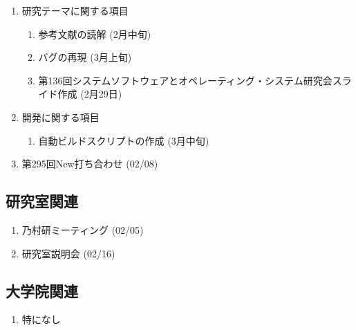 \documentclass[fleqn, 14pt]{extarticle}
\begin{document}
    \begin{enumerate}

        \item 研究テーマに関する項目
            \hfill
            \begin{enumerate}

                \item 参考文献の読解
                    \hfill
                    (2月中旬)

                \item バグの再現
                    \hfill
                    (3月上旬)

                \item 第136回システムソフトウェアとオペレーティング・システム研究会スライド作成
                    \hfill
                    (2月29日)


            \end{enumerate}

        \item 開発に関する項目
            \hfill
            \begin{enumerate}

                \item 自動ビルドスクリプトの作成
                    \hfill
                    (3月中旬)

            \end{enumerate}

        \item 第295回New打ち合わせ
            \hfill
            \label{enum-7}
            (02/08)

    \end{enumerate}

    \subsection{研究室関連}
    \label{sec-4-2}

    \begin{enumerate}

        \item 乃村研ミーティング
            \hfill
            \label{enum-18}
            (02/05)

        \item 研究室説明会
            \hfill
            \label{enum-18}
            (02/16)
    \end{enumerate}

    \subsection{大学院関連}
    \begin{enumerate}

        \item 特になし
            \hfill
            \label{enum-17}

    \end{enumerate}
\end{document}
